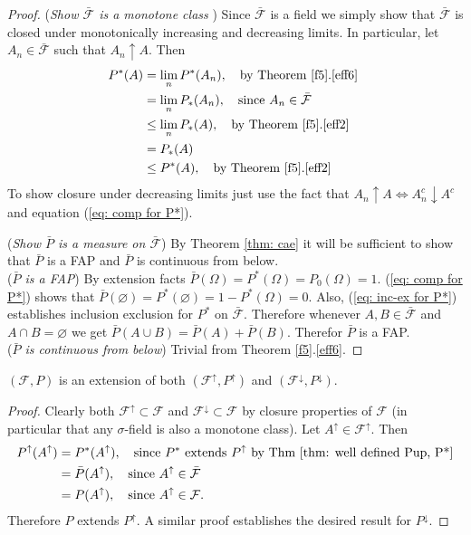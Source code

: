 \begin{proof}
({\sl Show $\bar{\mathcal F}$ is a monotone class }) Since $\bar{\mathcal F}$ is a field we simply show that $\bar{\mathcal F}$ is closed under monotonically increasing and decreasing limits. In particular, let $A_n\in \bar{\mathcal F}$ such that $A_n\uparrow A$. Then
\begin{align*}
P^*(A) &= \lim_{n} P^*(A_n),\quad\text{by Theorem \ref{f5}.\ref{eff6} } \\
&= \lim_{n} P_*(A_n),\quad\text{since $A_n\in \bar{\mathcal F}$} \\
&\leq  \lim_{n} P_*(A),\quad\text{by Theorem \ref{f5}.\ref{eff2} } \\
&=  P_*(A) \\
&\leq  P^*(A),\quad\text{by Theorem \ref{f5}.\ref{eff2} } \label{eq: inc-ex for P*}\\
\end{align*}
To show closure under decreasing limits just use the fact that $A_n\uparrow A\Longleftrightarrow A_n^c \downarrow A^c$ and equation (\ref{eq: comp for P*}).





({\sl Show $\bar P$ is a measure on $\bar{\mathcal F}$}) By Theorem \ref{thm: cae} it will be sufficient to show that $\bar P$ is a FAP and $\bar P$ is continuous from below. \\
\textbullet({\sl $\bar P$ is a FAP})
By extension facts $\bar P(\Omega) = P^*(\Omega) = P_0(\Omega) = 1$. (\ref{eq: comp for P*}) shows that $\bar P(\varnothing) = P^*(\varnothing) =1- P^*(\Omega) = 0$. Also, (\ref{eq: inc-ex for P*}) establishes inclusion exclusion for $P^*$ on $\bar{\mathcal F}$. Therefore whenever $A, B\in \bar{\mathcal F}$ and $A\cap B=\varnothing$ we get $\bar P(A\cup B)=\bar P(A)+\bar P(B)$. Therefor $\bar P$ is a FAP.
\\
\textbullet({\sl $\bar P$ is continuous from below}) Trivial from Theorem \ref{f5}.\ref{eff6}.
\end{proof}

\begin{theorem}
 $(\mathcal F, P)$ is an extension of both  $(\mathcal F^\uparrow, P^\uparrow)$ and   $(\mathcal F^\downarrow, P^\downarrow)$.
\end{theorem}
\begin{proof}
Clearly both $\mathcal F^\uparrow\subset \mathcal F$ and   $\mathcal F^\downarrow\subset \mathcal F$ by closure properties of $\mathcal F$ (in particular that any $\sigma$-field is also a monotone class). Let $A^\uparrow \in  \mathcal F^\uparrow$. Then
\begin{align*}
P^\uparrow(A^\uparrow) &= P^*(A^\uparrow),\quad\text{since $P^*$ extends $P^\uparrow$ by Thm \ref{thm: well defined Pup, P*}} \\
&= \bar P(A^\uparrow),\quad\text{since $A^\uparrow\in \bar{\mathcal F}$} \\
&= P(A^\uparrow),\quad\text{since $A^\uparrow\in \mathcal F$}.
\end{align*}
Therefore $P$ extends $P^\uparrow$. A similar proof establishes the desired result for $P^\downarrow$.
\end{proof}

